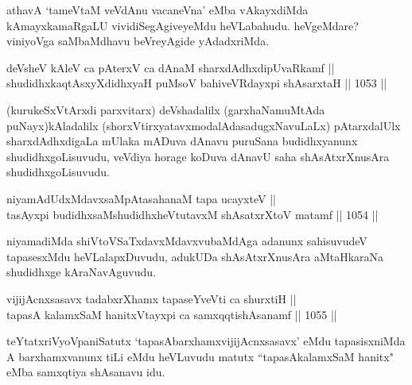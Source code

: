 \begin{artha}
athavA `tameVtaM veVdAnu vacaneVna' eMba vAkayxdiMda kAmayxkamaRgaLU vividiSegAgiveyeMdu heVLabahudu. heVgeMdare? viniyoVga saMbaMdhavu beVreyAgide yAdadxriMda.
\end{artha}


\begin{shl}
deVsheV kAleV ca pAterxV ca dAnaM sharxdAdhxdipUvaRkamf || \\
shudidhxkaqtAsxyXdidhxyaH puMsoV bahiveVRdayxpi shAsarxtaH ||  1053 ||  
\end{shl}

\begin{artha}
(kurukeSxVtArxdi parxvitarx) deVshadalilx (garxhaNamuMtAda puNayx)kAladalilx (shorxVtirxyatavxmodalAdasadugxNavuLaLx) pAtarxdalUlx sharxdAdhxdigaLa mUlaka mADuva dAnavu puruSana budidhxyanunx shudidhxgoLisuvudu, veVdiya horage koDuva dAnavU saha shAsAtxrXnusAra shudidhxgoLisuvudu.
\end{artha}


\begin{shl}
niyamAdUdxMdavxsaMpAtasahanaM tapa ucayxteV || \\
tasAyxpi budidhxsaMshudidhxheVtutavxM shAsatxrXtoV matamf ||  1054 ||  
\end{shl}

\begin{artha}
niyamadiMda shiVtoVSaTxdavxMdavxvubaMdAga adanunx sahisuvudeV tapasesxMdu heVLalapxDuvudu, adukUDa shAsAtxrXnusAra aMtaHkaraNa shudidhxge kAraNavAguvudu.
\end{artha}

\begin{shl}
vijijAcnxsasavx tadabxrXhamx tapaseYveVti ca shurxtiH || \\
tapasA kalamxSaM hanitxVtayxpi ca samxqqtishAsanamf ||  1055 ||  
\end{shl}

\begin{artha}
teYtatxriVyoVpaniSatutx `tapasAbarxhamxvijijAcnxsasavx' eMdu tapasisxniMda A barxhamxvanunx tiLi eMdu heVLuvudu matutx ``tapasAkalamxSaM hanitx" eMba samxqtiya shAsanavu idu.
\end{artha}


